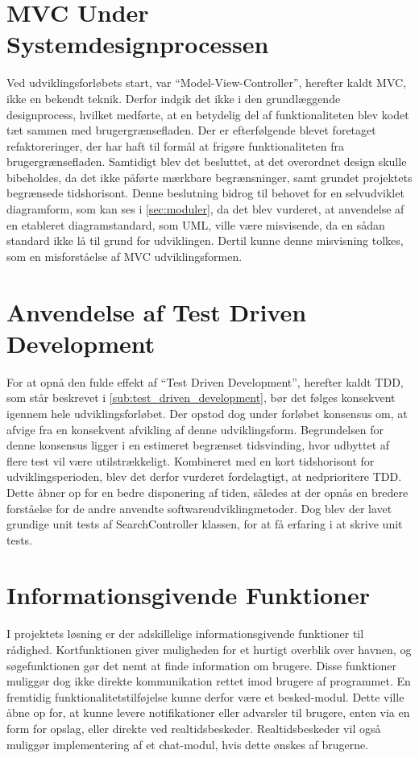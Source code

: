 \section{MVC Under Systemdesignprocessen}

Ved udviklingsforløbets start, var \enquote{Model-View-Controller}, herefter kaldt MVC, ikke en bekendt teknik. Derfor indgik det ikke i den grundlæggende designprocess, hvilket medførte, at en betydelig del af funktionaliteten blev kodet tæt sammen med brugergrænsefladen. Der er efterfølgende blevet foretaget refaktoreringer, der har haft til formål at frigøre funktionaliteten fra brugergrænsefladen. Samtidigt blev det besluttet, at det overordnet design skulle bibeholdes, da det ikke påførte mærkbare begrænsninger, samt grundet projektets begrænsede tidshorisont. Denne beslutning bidrog til behovet for en selvudviklet diagramform, som kan ses i \cref{sec:moduler}, da det blev vurderet, at anvendelse af en etableret diagramstandard, som UML, ville være misvisende, da en sådan standard ikke lå til grund for udviklingen. Dertil kunne denne misvisning tolkes, som en misforståelse af MVC udviklingsformen.

\section{Anvendelse af Test Driven Development}

For at opnå den fulde effekt af \enquote{Test Driven Development}, herefter kaldt TDD, som står beskrevet i \cref{sub:test_driven_development}, bør det følges konsekvent igennem hele udviklingsforløbet. Der opstod dog under forløbet konsensus om, at afvige fra en konsekvent afvikling af denne udviklingsform. Begrundelsen for denne konsensus ligger i en estimeret begrænset tidsvinding, hvor udbyttet af flere test vil være utilstrækkeligt. Kombineret med en kort tidshorisont for udviklingsperioden, blev det derfor vurderet fordelagtigt, at nedprioritere TDD. Dette åbner op for en bedre disponering af tiden, således at der opnås en bredere forståelse for de andre anvendte softwareudviklingmetoder. Dog blev der lavet grundige unit tests af SearchController klassen, for at få erfaring i at skrive unit tests.

\section{Informationsgivende Funktioner}

I projektets løsning er der adskillelige informationsgivende funktioner til rådighed. Kortfunktionen giver muligheden for et hurtigt overblik over havnen, og søgefunktionen gør det nemt at finde information om brugere. Disse funktioner muliggør dog ikke direkte kommunikation rettet imod brugere af programmet. En fremtidig funktionalitetstilføjelse kunne derfor være et besked-modul. Dette ville åbne op for, at kunne levere notifikationer eller advarsler til brugere, enten via en form for opslag, eller direkte ved realtidsbeskeder. Realtidsbeskeder vil også muliggør implementering af et chat-modul, hvis dette ønskes af brugerne.